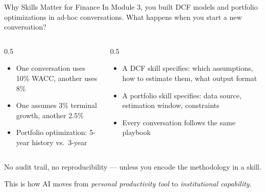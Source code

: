 \documentclass[aspectratio=169]{beamer}
\begin{document}
\begin{frame}{Why Skills Matter for Finance}
In Module 3, you built DCF models and portfolio optimizations in ad-hoc conversations. What happens when you start a new conversation?
\vspace{0.3cm}
\begin{columns}[T]
\begin{column}{0.5\textwidth}
\begin{shadedbox}[title=\textbf{The Problem}]
\begin{itemize}\small
  \item One conversation uses 10\% WACC, another uses 8\%
  \item One assumes 3\% terminal growth, another 2.5\%
  \item Portfolio optimization: 5-year history vs.\ 3-year
\end{itemize}
\end{shadedbox}
\end{column}
\begin{column}{0.5\textwidth}
\begin{shadedbox}[title=\textbf{The Fix: Skills}]
\begin{itemize}\small
  \item A DCF skill specifies: which assumptions, how to estimate them, what output format
  \item A portfolio skill specifies: data source, estimation window, constraints
  \item \alert{Every conversation follows the same playbook}
\end{itemize}
\end{shadedbox}
\end{column}
\end{columns}
\vspace{0.3cm}
\alert{No audit trail, no reproducibility --- unless you encode the methodology in a skill.}
\vspace{0.2cm}
\begin{center}
This is how AI moves from \textit{personal productivity tool} to \textit{institutional capability}.
\end{center}
\end{frame}
\end{document}
